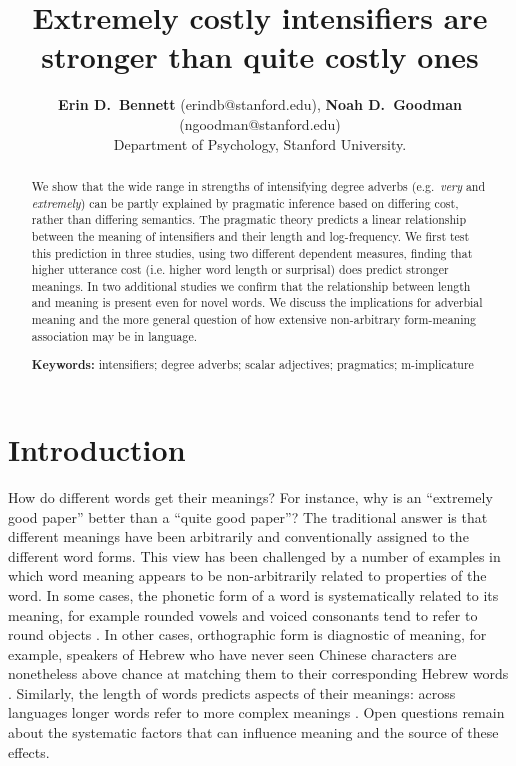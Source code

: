 \documentclass[10pt,letterpaper]{article}
\title{Extremely costly intensifiers are stronger than quite costly ones}
\author{{\large \bf Erin D.~Bennett} (erindb@stanford.edu), {\large \bf Noah D.~Goodman} (ngoodman@stanford.edu)\\
  Department of Psychology, Stanford University.}
\newcommand{\w}[1]{\emph{#1}}
\begin{document}
\maketitle

\begin{abstract}

We show that the wide range in strengths of intensifying degree adverbs (e.g.~\w{very} and \w{extremely}) can be partly explained by pragmatic inference based on differing cost, rather than differing semantics.
The pragmatic theory predicts a linear relationship between the meaning of intensifiers and their length and log-frequency.
We first test this prediction in three studies, using two different dependent measures, finding that higher utterance cost (i.e. higher word length or surprisal) does predict stronger meanings.
In two additional studies we confirm that the relationship between length and meaning is present even for novel words.
We discuss the implications for adverbial meaning and the more general question of how extensive non-arbitrary form-meaning association may be in language.

\textbf{Keywords:} 
intensifiers; degree adverbs; scalar adjectives; pragmatics; m-implicature
\end{abstract}

\section{Introduction}

How do different words get their meanings?
For instance, why is an ``extremely good paper'' better than a ``quite good paper''?
The traditional answer \cite{de_saussure_nature_1916} is that different meanings have been arbitrarily and conventionally assigned to the different word forms.
This view has been challenged by a number of examples in which word meaning appears to be non-arbitrarily related to properties of the word.
In some cases, the phonetic form of a word is systematically related to its meaning, for example rounded vowels and voiced consonants tend to refer to round objects \cite{kohler_gestalt_1970, ramachandran_synaesthesiawindow_2001, holland_physiognomic_1964, davis_fitness_1961}.
In other cases, orthographic form is diagnostic of meaning, for example, speakers of Hebrew who have never seen Chinese characters are nonetheless above chance at matching them to their corresponding Hebrew words \cite{koriat_figural_1979}.
Similarly, the length of words predicts aspects of their meanings: across languages longer words refer to more complex meanings \cite{lewis_conceptual_2016}.
Open questions remain about the systematic factors that can influence meaning and the source of these effects.
\end{document}
